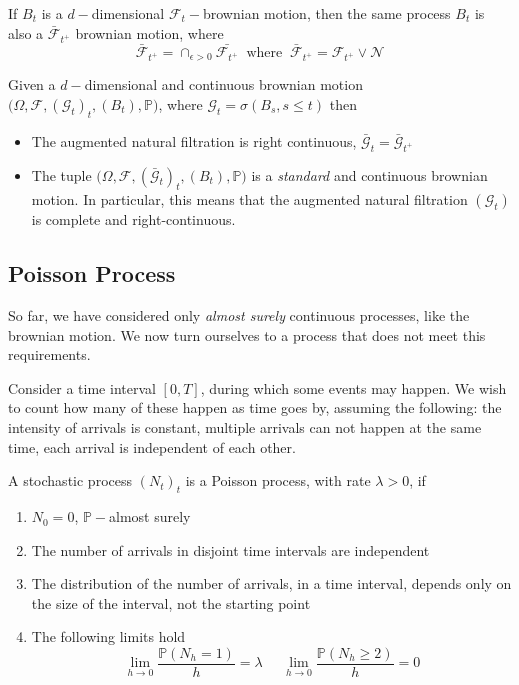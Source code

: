 \begin{corollary}
    If $B_t$ is a $d-$dimensional $\mathcal{F}_t- $brownian motion, then the same process $B_t$ is also a $\bar{\mathcal{F}}_{t^+}$ brownian motion, where
    \begin{equation*}
        \bar{\mathcal{F}}_{t^+} = \cap_{\epsilon > 0} \bar{\mathcal{F}_{t^+}} \;\; \text{where} \;\; \bar{\mathcal{F}}_{t^+} = \mathcal{F}_{t^+} \vee \mathcal{N}
    \end{equation*}
\end{corollary}

\begin{proposition}
    Given a $d-$dimensional and continuous brownian motion $\big( \Omega, \mathcal{F}, (\mathcal{G}_t)_t, (B_t), \mathbb{P} \big)$, where $\mathcal{G}_t = \sigma(B_s, s \leq t)$ then
    \begin{itemize}
        \item The augmented natural filtration is right continuous, $\bar{\mathcal{G}}_{t} = \bar{\mathcal{G}}_{t^+}$
        \item The tuple $\big( \Omega, \mathcal{F}, (\bar{\mathcal{G}}_t)_t, (B_t), \mathbb{P} \big)$ is a \textit{standard} and continuous brownian motion. In particular, this means that the augmented natural filtration $(\mathcal{G}_t)$ is complete and right-continuous. 
    \end{itemize}
\end{proposition}

\subsection{Poisson Process}
So far, we have considered only \textit{almost surely} continuous processes, like the brownian motion. We now turn ourselves to a process that does not meet this requirements. 

Consider a time interval $[0,T]$, during which some events may happen. We wish to count how many of these happen as time goes by, assuming the following: the intensity of arrivals is constant, multiple arrivals can not happen at the same time, each arrival is independent of each other. 

\begin{definition}
    A stochastic process $(N_t)_t$ is a Poisson process, with rate $\lambda > 0$, if 
    \begin{enumerate}
        \item $N_0 = 0$, $\mathbb{P}-$almost surely
        \item The number of arrivals in disjoint time intervals are independent 
        \item The distribution of the number of arrivals, in a time interval, depends only on the size of the interval, not the starting point
        \item The following limits hold
        \begin{equation*}
            \lim_{h \to 0} \frac{\mathbb{P}(N_h = 1)}{h} = \lambda \;\;\;\;\; \lim_{h \to 0} \frac{\mathbb{P}(N_h \geq 2)}{h} = 0
        \end{equation*}
    \end{enumerate}
\end{definition}

